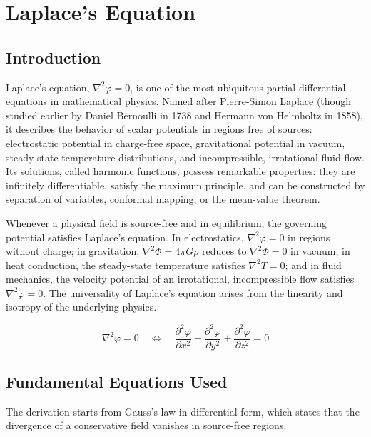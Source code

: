 \chapter{Laplace's Equation}

\section*{Introduction}

Laplace's equation, $\nabla^{2}\varphi = 0$, is one of the most ubiquitous partial differential equations in mathematical physics. Named after Pierre-Simon Laplace (though studied earlier by Daniel Bernoulli in 1738 and Hermann von Helmholtz in 1858), it describes the behavior of scalar potentials in regions free of sources: electrostatic potential in charge-free space, gravitational potential in vacuum, steady-state temperature distributions, and incompressible, irrotational fluid flow. Its solutions, called harmonic functions, possess remarkable properties: they are infinitely differentiable, satisfy the maximum principle, and can be constructed by separation of variables, conformal mapping, or the mean-value theorem.

Whenever a physical field is source-free and in equilibrium, the governing potential satisfies Laplace's equation. In electrostatics, $\nabla^{2}\varphi = 0$ in regions without charge; in gravitation, $\nabla^{2}\Phi = 4\pi G\rho$ reduces to $\nabla^{2}\Phi = 0$ in vacuum; in heat conduction, the steady-state temperature satisfies $\nabla^{2}T = 0$; and in fluid mechanics, the velocity potential of an irrotational, incompressible flow satisfies $\nabla^{2}\varphi = 0$. The universality of Laplace's equation arises from the linearity and isotropy of the underlying physics.


\begin{equation}
\boxed{\; \nabla^{2}\varphi = 0 \quad\Longleftrightarrow\quad \frac{\partial^{2}\varphi}{\partial x^{2}} + \frac{\partial^{2}\varphi}{\partial y^{2}} + \frac{\partial^{2}\varphi}{\partial z^{2}} = 0\;}
\label{eq:laplace}
\end{equation}

\section*{Fundamental Equations Used}

The derivation starts from Gauss's law in differential form, which states that the divergence of a conservative field vanishes in source-free regions.

